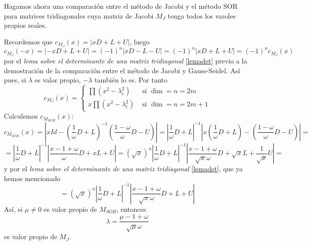     Hagamos ahora una comparación entre el método de Jacobi y el método SOR para matrices tridiagonales cuya matriz de Jacobi $M_J$ tenga todos los varoles propios reales. 
    \begin{obs}
        Recordemos que $c_{M_J}(x)=|xD+L+U|$, luego $$c_{M_J}(-x)=|-xD+L+U|=(-1)^n|xD-L-U|=(-1)^n|xD+L+U|=(-1)^nc_{M_J}(x)$$
        por el \textit{lema sobre el determinante de una matriz tridiagonal} \ref{lemadet} previo a la demostración de la comparación entre el método de Jacobi y Gauss-Seidel. Así pues, si $\lambda$ es valor propio, $-\lambda$ también lo es. Por tanto
        $$c_{M_J}(x)=\left\{ \begin{array}{ll}
             \prod(x^2-\lambda_i^2) &  \text{ si }\dim =n=2m \\
             x \prod(x^2-\lambda_i^2) & \text{ si }\dim =n=2m+1
        \end{array} \right.$$
        Calculemos $c_{M_{SOR}}(x)$:
        $$c_{M_{SOR}}(x)=\left| xId- \left( \dfrac{1}{\omega} D + L \right)^{-1} \left( \dfrac{1-\omega}{\omega} D - U \right) \right| =\left| \dfrac{1}{\omega} D + L  \right|^{-1}\left| x \left( \dfrac{1}{\omega} D + L \right) - \left( \dfrac{1-\omega}{\omega} D - U \right) \right| =$$
        $$=\left| \dfrac{1}{\omega} D + L  \right|^{-1}\left|\dfrac{x-1+\omega}{\omega} D + xL + U  \right| = (\sqrt{x})^n \left| \dfrac{1}{\omega} D + L  \right|^{-1} \left|\dfrac{x-1+\omega}{\sqrt{x}\omega} D + \sqrt{x} L + \dfrac{1}{\sqrt{x}} U  \right|=$$
        y por el \textit{lema sobre el determinante de una matriz tridiagonal} \ref{lemadet}, que ya hemos mencionado
        $$=(\sqrt{x})^n \left| \dfrac{1}{\omega} D + L  \right|^{-1} \left|\dfrac{x-1+\omega}{\sqrt{x}\omega} D +  L + U  \right|$$
        Así, si $\mu \neq 0$ es valor propio de $M_{SOR}$, entonces
        $$\lambda=\dfrac{\mu - 1+ \omega }{\sqrt{\mu} \omega}$$
        es valor propio de $M_J$. 


\end{obs}
